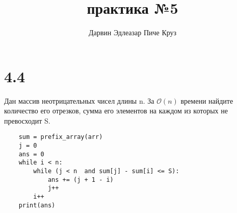\documentclass{article}
\title{практика №5}
\author{Дарвин Эдлеазар Пиче Круз}
\begin{document}
\maketitle

\section*{4.4}
Дан массив неотрицательных чисел длины n. За $\mathcal{O}(n)$ времени найдите количество
его отрезков, сумма его элементов на каждом из которых не превосходит S.

\begin{lstlisting}
    sum = prefix_array(arr)
    j = 0
    ans = 0
    while i < n:
        while (j < n  and sum[j] - sum[i] <= S):
            ans += (j + 1 - i)
            j++
        i++
    print(ans)
\end{lstlisting}
\end{document}
